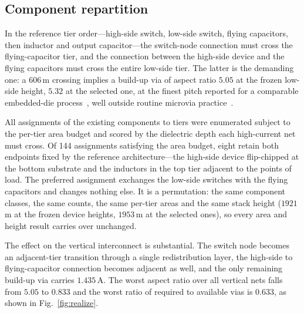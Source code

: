 \documentclass[journal]{IEEEtran}
\begin{document}
\subsection{Component repartition}
In the reference tier order---high-side switch, low-side switch, flying capacitors, then
inductor and output capacitor---the switch-node connection must cross the flying-capacitor
tier, and the connection between the high-side device and the flying capacitors must cross
the entire low-side tier. The latter is the demanding one: a $606$\,\textmu m crossing implies
a build-up via of aspect ratio $5.05$ at the frozen low-side height, $5.32$ at the selected
one, at the finest pitch reported for a comparable
embedded-die process~\cite{Ostmann2008ChipEmbedding}, well outside routine microvia
practice~\cite{Cauwe2023HDI}.

All assignments of the existing components to tiers were enumerated subject to the per-tier
area budget and scored by the dielectric depth each high-current net must cross. Of 144
assignments satisfying the area budget, eight retain both endpoints fixed by the reference
architecture---the high-side device flip-chipped at the bottom substrate and the inductors in
the top tier adjacent to the points of load. The preferred assignment exchanges the low-side
switches with the flying capacitors and changes nothing else. It is a permutation: the same
component classes, the same counts, the same per-tier areas and the same stack height
($1921$\,\textmu m at the frozen device heights, $1953$\,\textmu m at the selected ones), so
every area and height result carries over unchanged.

The effect on the vertical interconnect is substantial. The switch node becomes an
adjacent-tier transition through a single redistribution layer, the high-side to
flying-capacitor connection becomes adjacent as well, and the only remaining build-up via
carries $1.435$\,A. The worst aspect ratio over all vertical nets falls from $5.05$ to
$0.833$ and the worst ratio of required to available vias is $0.633$, as shown in
Fig.~\ref{fig:realize}.

\end{document}
